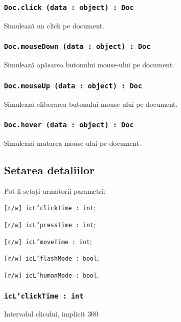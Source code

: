 \subsubsection{\texttt{Doc.click (data : object) : Doc}}

Simulează un click pe document.

\subsubsection{\texttt{Doc.mouseDown (data : object) : Doc}}

Simulează apăsarea butonului mouse-ului pe document.

\subsubsection{\texttt{Doc.mouseUp (data : object) : Doc}}

Simulează eliberarea butonului mouse-ului pe document.

\subsubsection{\texttt{Doc.hover (data : object) : Doc}}

Simulează mutarea mouse-ului pe document.

\subsection{Setarea detaliilor}

Pot fi setați următorii parametri:
\begin{icItems}
	\item \texttt{[r/w] icL'clickTime : int};
	\item \texttt{[r/w] icL'pressTime : int};
	\item \texttt{[r/w] icL'moveTime : int};
	\item \texttt{[r/w] icL'flashMode : bool};
	\item \texttt{[r/w] icL'humanMode : bool}.
\end{icItems}

\subsubsection{\texttt{icL'clickTime : int}}

Intervalul clicului, implicit 300.

